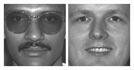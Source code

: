 \begin{figure}[ht]
\begin{center}
  \includegraphics[width=\columnwidth/10]{ch5/figures/feret3.jpg}
  \includegraphics[width=\columnwidth/10]{ch5/figures/feret4.jpg}

\end{center}
\end{figure}
